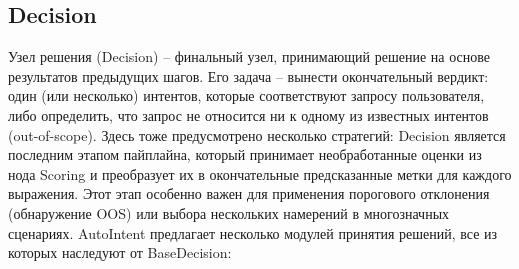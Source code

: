 \documentclass[14pt,a4paper,oneside,openany]{extbook}
\begin{document}
\subsection{Decision}
\label{sec:org86fbbea}
Узел решения (Decision) – финальный узел, принимающий решение на основе результатов предыдущих шагов. Его задача – вынести окончательный вердикт: один (или несколько) интентов, которые соответствуют запросу пользователя, либо определить, что запрос не относится ни к одному из известных интентов (out-of-scope). Здесь тоже предусмотрено несколько стратегий: Decision является последним этапом пайплайна, который принимает необработанные оценки из нода Scoring и преобразует их в окончательные предсказанные метки для каждого выражения. Этот этап особенно важен для применения порогового отклонения (обнаружение OOS) или выбора нескольких намерений в многозначных сценариях. AutoIntent предлагает несколько модулей принятия решений, все из которых наследуют от BaseDecision:
\end{document}
